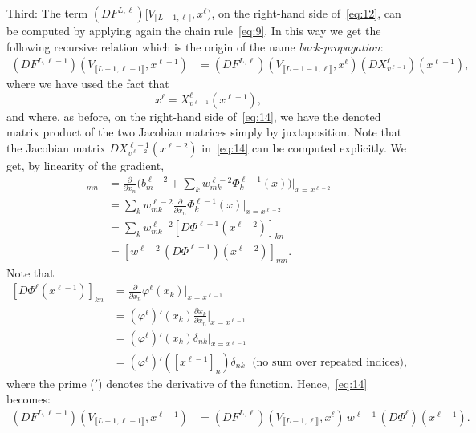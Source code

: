 \documentclass[10pt, a4paper]{article}
\theoremstyle{plain}
\theoremstyle{definition}
\theoremstyle{definition}
\theoremstyle{definition}
\theoremstyle{definition}
\theoremstyle{definition}
\theoremstyle{definition}
\theoremstyle{definition}
\theoremstyle{remark}
\theoremstyle{remark}
\theoremstyle{rudin-style-generic}
\theoremstyle{rudin-style-generic*}
\theoremstyle{rudin-style-theorem}
\begin{document}
  Third:
  The term $(D F^{L,\ell})[V_{\llbracket L-1,\ell\rrbracket}, x^\ell )$, on the right-hand side of~\eqref{eq:12},
  can be computed by applying again the chain rule~\eqref{eq:9}.
  In this way we get the following recursive relation which is the origin of the name \textit{back-propagation}:
  \begin{equation}\label{eq:14}
    \begin{aligned}
      (D F^{L,\ell-1})(V_{\llbracket L - 1 , \ell-1 \rrbracket } , x^{\ell-1}  )
      &= (D F^{L,\ell})(V_{\llbracket L-1-1,\ell \rrbracket}, x^{\ell} )  (DX^{\ell}_{v^{\ell-1}}) ( x^{\ell-1} )   
        ,
    \end{aligned}
  \end{equation}
  where  we have used the fact that
  \begin{equation*}
    x^{\ell} = X^{\ell}_{v^{\ell-1}} ( x^{\ell-1} ),
  \end{equation*}
  and where, as before, on the right-hand side of~\eqref{eq:14}, we have the denoted matrix product of the two Jacobian matrices  simply by juxtaposition.
  Note that the Jacobian matrix $DX^{\ell-1}_{v^{\ell-2}}( x^{\ell-2 } )$ in~\eqref{eq:14} can be computed explicitly.
  We get, by linearity of the gradient,
  \begin{align*}
    [(DX^{\ell-1}_{v^{\ell-2}}) ( x^{\ell-2} ) )]_{mn}
    &=  \frac{\partial}{\partial x_n} \big( b^{\ell-2}_m + \sum_k w^{\ell-2}_{mk}\Phi^{\ell-1}_k( x ) \big)\Big|_{x = x^{\ell-2}} \\
    &=   \sum_k w^{\ell-2}_{mk} \frac{\partial}{\partial x_n} \Phi^{\ell-1}_k( x )  \Big|_{x = x^{\ell-2}} \\
    &=   \sum_k w^{\ell-2}_{mk}  [D\Phi^{\ell-1}( x^{\ell-2} )]_{kn}  \\
    &=    [ w^{\ell-2} \,  (D\Phi^{\ell-1})( x^{\ell-2} )  ]_{mn} 
    .
  \end{align*}
  Note that 
  \begin{equation}
    \label{eq:15}
    \begin{aligned}
      [D\Phi^{\ell}(x^{\ell-1})]_{kn}
      &=  \frac{\partial}{\partial x_n} \varphi^\ell( x_k ) \Big|_{x = x^{\ell-1} } \\
      &=  (\varphi^\ell)' ( x_k )  \frac{\partial x_k}{\partial x_n}\Big|_{x = x^{\ell-1}} \\
      &=  (\varphi^\ell)' ( x_k )  \delta_{nk} \Big|_{x = x^{\ell-1} } \\
      &= (\varphi^\ell)'( [x^{\ell-1}]_n) \delta_{nk} \;\text{ (no sum over repeated indices)}
        ,
    \end{aligned}
  \end{equation}
  where the prime ($'$) denotes the derivative of the function.
  Hence,~\eqref{eq:14} becomes:
  \begin{equation}\label{eq:16}
    \begin{aligned}
      (D F^{L,\ell-1})(V_{\llbracket L- 1 , \ell-1 \rrbracket } , x^{\ell-1} )
      &= (D F^{L,\ell})(V_{\llbracket L-1,\ell \rrbracket},  x^{\ell}  ) \, w^{\ell-1} \, (D\Phi^{\ell})(x^{\ell-1} )  
        .
    \end{aligned}
  \end{equation}
\end{document}
